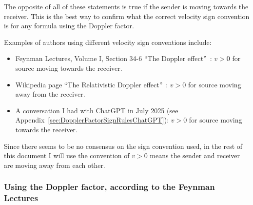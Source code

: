 \documentclass[a4paper]{article}
\theoremstyle{plain}
\theoremstyle{definition}
\begin{document}
The opposite of all of these statements is true if the sender is
moving towards the receiver.  This is the best way to confirm what the
correct velocity sign convention is for any formula using the Doppler
factor.

Examples of authors using different velocity sign conventions include:
\begin{itemize}
\item Feynman Lectures, Volume I, Section 34-6 ``The Doppler
  effect''~\cite{FeynmanLecturesVolICh34Sec6}: $v > 0$ for source
  moving towards the receiver.
\item Wikipedia page ``The Relativistic Doppler
  effect''~\cite{WikipediaRelativisticDopplerEffect}: $v > 0$ for
  source moving away from the receiver.
\item A conversation I had with ChatGPT in July 2025 (see
  Appendix~\ref{sec:DopplerFactorSignRulesChatGPT}): $v > 0$ for
  source moving towards the receiver.
\end{itemize}

Since there seems to be no consensus on the sign convention used, in
the rest of this document I will use the convention of $v > 0$ means
the sender and receiver are moving away from each other.


\subsubsection{Using the Doppler factor, according to the Feynman Lectures}
\label{sec:DopplerFactorSignRulesFeynmanLectures}
\end{document}
